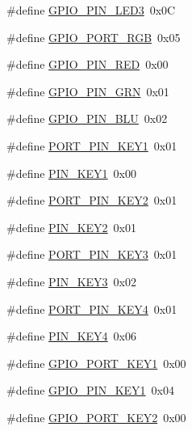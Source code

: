 \begin{DoxyCompactItemize}
\item 
\#define \hyperlink{group__hardware_ga9e7e83187eae26d02136f609392fabd0}{G\+P\+I\+O\+\_\+\+P\+I\+N\+\_\+\+L\+E\+D3}~0x0C
\item 
\#define \hyperlink{group__hardware_ga9e2ed2756af597d0ec2ee618ef235c7e}{G\+P\+I\+O\+\_\+\+P\+O\+R\+T\+\_\+\+R\+GB}~0x05
\item 
\#define \hyperlink{group__hardware_gaa4aae4b49bb53e52b78b530637dcd2d7}{G\+P\+I\+O\+\_\+\+P\+I\+N\+\_\+\+R\+ED}~0x00
\item 
\#define \hyperlink{group__hardware_ga8ce252c71154210c65808a2170d74223}{G\+P\+I\+O\+\_\+\+P\+I\+N\+\_\+\+G\+RN}~0x01
\item 
\#define \hyperlink{group__hardware_ga2aa9b3c113e9f52a2e04ff811b8ec518}{G\+P\+I\+O\+\_\+\+P\+I\+N\+\_\+\+B\+LU}~0x02
\item 
\#define \hyperlink{group__hardware_gafe1bf3da61040955deda9703ee539687}{P\+O\+R\+T\+\_\+\+P\+I\+N\+\_\+\+K\+E\+Y1}~0x01
\item 
\#define \hyperlink{group__hardware_ga332cf72d49bf86b7b20274f3dec99d7b}{P\+I\+N\+\_\+\+K\+E\+Y1}~0x00
\item 
\#define \hyperlink{group__hardware_ga2cc4114181749a25732e31ed271a1f6b}{P\+O\+R\+T\+\_\+\+P\+I\+N\+\_\+\+K\+E\+Y2}~0x01
\item 
\#define \hyperlink{group__hardware_gae87128e49906c97fa9d6b438a08c1221}{P\+I\+N\+\_\+\+K\+E\+Y2}~0x01
\item 
\#define \hyperlink{group__hardware_ga5f697895be4580f403de4a9f75ab8a3b}{P\+O\+R\+T\+\_\+\+P\+I\+N\+\_\+\+K\+E\+Y3}~0x01
\item 
\#define \hyperlink{group__hardware_gaec621d9712815696a7bd342db8b2ff06}{P\+I\+N\+\_\+\+K\+E\+Y3}~0x02
\item 
\#define \hyperlink{group__hardware_gac86eb82e082d51cc0d4b0a87680cd7da}{P\+O\+R\+T\+\_\+\+P\+I\+N\+\_\+\+K\+E\+Y4}~0x01
\item 
\#define \hyperlink{group__hardware_gaf59a027359301b6e2229f7068c36efe6}{P\+I\+N\+\_\+\+K\+E\+Y4}~0x06
\item 
\#define \hyperlink{group__hardware_gabce59bc33538c850842e408765ae4981}{G\+P\+I\+O\+\_\+\+P\+O\+R\+T\+\_\+\+K\+E\+Y1}~0x00
\item 
\#define \hyperlink{group__hardware_ga26fa1a6916e027dcfa2d5a76c18dccb4}{G\+P\+I\+O\+\_\+\+P\+I\+N\+\_\+\+K\+E\+Y1}~0x04
\item 
\#define \hyperlink{group__hardware_gaeaf62bdfcf5fc1fe75d98d961286be78}{G\+P\+I\+O\+\_\+\+P\+O\+R\+T\+\_\+\+K\+E\+Y2}~0x00
\item 

\end{DoxyCompactItemize}
